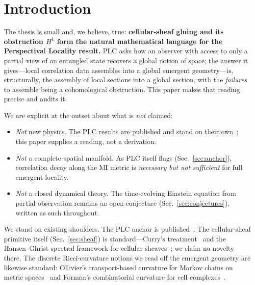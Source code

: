 \documentclass[aps,pra,twocolumn,superscriptaddress,floatfix]{revtex4-2}
\theoremstyle{definition}
\begin{document}
\maketitle

\section{Introduction}
\label{sec:intro}

The thesis is small and, we believe, true: \textbf{cellular-sheaf gluing and
its obstruction $H^1$ form the natural mathematical language for the
Perspectival Locality result.} PLC asks how an observer with access to only a
partial view of an entangled state recovers a global notion of space; the
answer it gives---local correlation data assembles into a global emergent
geometry---is, structurally, the assembly of local sections into a global
section, with the \emph{failures} to assemble being a cohomological
obstruction. This paper makes that reading precise and audits it.

We are explicit at the outset about what is \emph{not} claimed:
\begin{itemize}
\item \emph{Not} new physics. The PLC results are published and stand on their
own~\cite{glass2026plc1}; this paper supplies a reading, not a derivation.
\item \emph{Not} a complete spatial manifold. As PLC itself flags
(Sec.~\ref{sec:anchor}), correlation decay along the MI metric is
\emph{necessary but not sufficient} for full emergent locality.
\item \emph{Not} a closed dynamical theory. The time-evolving Einstein equation
from partial observation remains an open conjecture (Sec.~\ref{sec:conjectures}),
written as such throughout.
\end{itemize}

We stand on existing shoulders. The PLC anchor is
published~\cite{glass2026plc1}. The cellular-sheaf primitive itself
(Sec.~\ref{sec:sheaf}) is standard---Curry's
treatment~\cite{curry2014} and the Hansen--Ghrist spectral framework for
cellular sheaves~\cite{hansenghrist2019}; we claim no novelty there. The
discrete Ricci-curvature notions we read off the emergent geometry are likewise
standard: Ollivier's transport-based curvature for Markov chains on metric
spaces~\cite{ollivier2009} and Forman's combinatorial curvature for cell
complexes~\cite{forman2003}.
\end{document}
